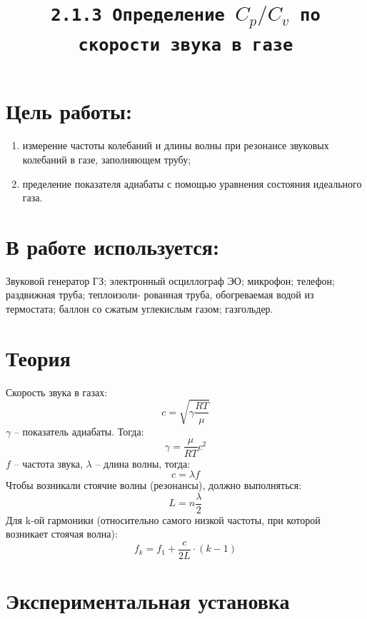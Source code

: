 \documentclass[11pt,a4paper]{article}
\title{\texttt{2.1.3 Определение $C_p /C_v$ по скорости звука в газе}}\date{}\author{}
\begin{document}
\maketitle

\section*{Цель работы:}
  \begin{enumerate}
    \item измерение частоты колебаний и длины волны при
  резонансе звуковых колебаний в газе, заполняющем трубу;
   \item пределение
   показателя адиабаты с помощью уравнения состояния идеального газа.
  \end{enumerate}

\section*{В работе используется:} 
  Звуковой генератор ГЗ; электронный осциллограф ЭО; 
  микрофон; телефон; раздвижная труба; теплоизоли-
  рованная труба, обогреваемая водой из термостата; баллон со сжатым
  углекислым газом; газгольдер.

\section*{Теория}
  Скорость звука в газах: 
  \begin{equation*}
    c = \sqrt{\gamma\frac{RT}{\mu}}
  \end{equation*}
  $\gamma$ -- показатель адиабаты.
  Тогда:
  \begin{equation*}
    \gamma = \frac{\mu}{RT}c^2
  \end{equation*}
  $f$ -- частота звука, $\lambda$ -- длина волны, тогда:
  \begin{equation*}
    c = \lambda f
  \end{equation*}
  Чтобы возникали стоячие волны (резонансы), должно выполняться:
  \begin{equation*}
    L = n\frac{\lambda}{2}
  \end{equation*}
  Для k-ой гармоники (относительно самого низкой частоты, при которой возникает стоячая волна):
  \begin{equation*}
    f_k = f_1 + \frac{c}{2L} \cdot (k - 1)
  \end{equation*}

\section*{Экспериментальная установка}
\end{document}
